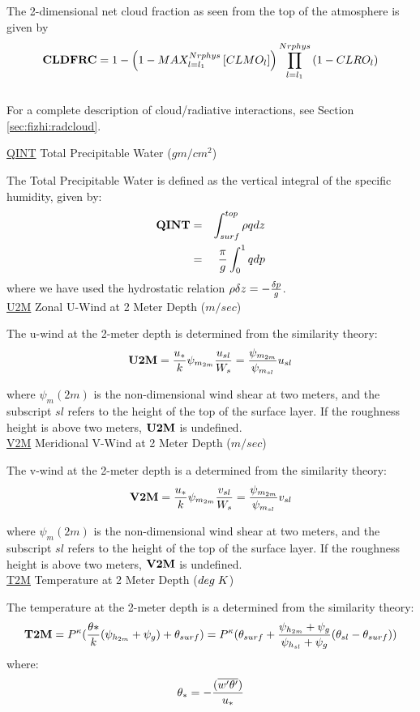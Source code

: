 \noindent
The 2-dimensional net cloud fraction as seen from the top of the
atmosphere is given by
\[
{\bf CLDFRC} = 1-\left( 1-MAX_{l=l_1}^{Nrphys} \left[ CLMO_l \right] \right)
    \prod_{l=l_1}^{Nrphys} \left( 1-CLRO_l \right)
\]
\\
For a complete description of cloud/radiative interactions, see Section \ref{sec:fizhi:radcloud}.


\noindent
{ \underline {QINT} Total Precipitable Water ($gm/cm^2$) }

\noindent
The Total Precipitable Water is defined as the vertical integral of the specific humidity,
given by:
\begin{eqnarray*}
{\bf QINT} & = & \int_{surf}^{top} \rho q dz \\
           & = & {\pi \over g} \int_0^1 q dp
\end{eqnarray*}
where we have used the hydrostatic relation 
$\rho \delta z = -{\delta p \over g} $.
\\


\noindent
{ \underline {U2M}  Zonal U-Wind at 2 Meter Depth ($m/sec$) }

\noindent
The u-wind at the 2-meter depth is determined from the similarity theory:
\[
{\bf U2M} = {u_* \over k} \psi_{m_{2m}} {u_{sl} \over {W_s}} =
{ \psi_{m_{2m}} \over {\psi_{m_{sl}} }}u_{sl}
\]

\noindent
where $\psi_m(2m)$ is the non-dimensional wind shear at two meters, and the subscript
$sl$ refers to the height of the top of the surface layer. If the roughness height
is above two meters, ${\bf U2M}$ is undefined.
\\
 
\noindent
{ \underline {V2M}  Meridional V-Wind at 2 Meter Depth ($m/sec$) }

\noindent
The v-wind at the 2-meter depth is a determined from the similarity theory:
\[
{\bf V2M} = {u_* \over k} \psi_{m_{2m}} {v_{sl} \over {W_s}} =
{ \psi_{m_{2m}} \over {\psi_{m_{sl}} }}v_{sl}
\]

\noindent
where $\psi_m(2m)$ is the non-dimensional wind shear at two meters, and the subscript
$sl$ refers to the height of the top of the surface layer. If the roughness height
is above two meters, ${\bf V2M}$ is undefined.
\\
 
\noindent
{ \underline {T2M}  Temperature at 2 Meter Depth ($deg \hspace{.1cm} K$) }

\noindent
The temperature at the 2-meter depth is a determined from the similarity theory:
\[
{\bf T2M} = P^{\kappa} ({\theta* \over k} ({\psi_{h_{2m}}+\psi_g}) + \theta_{surf} ) = 
P^{\kappa}(\theta_{surf} + { {\psi_{h_{2m}}+\psi_g} \over {{\psi_{h_{sl}}+\psi_g}} }
(\theta_{sl} - \theta_{surf})) 
\]
where:
\[
\theta_* = - { (\overline{w^{\prime}\theta^{\prime}}) \over {u_*} }
\]

